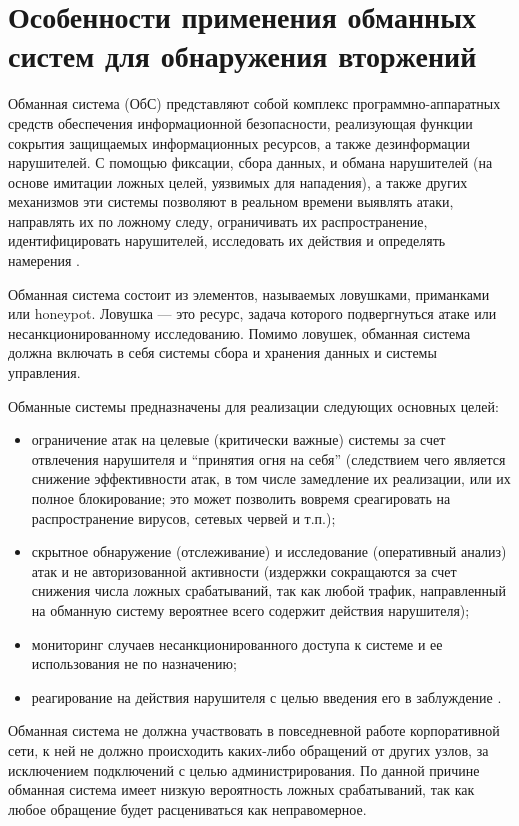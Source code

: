 \section{Особенности применения обманных систем для обнаружения вторжений}

Обманная система (ОбС) представляют собой комплекс программно-аппаратных средств обеспечения информационной безопасности, реализующая функции сокрытия защищаемых информационных ресурсов, а также дезинформации нарушителей. С помощью фиксации, сбора данных, и обмана нарушителей (на основе имитации ложных целей, уязвимых для нападения), а также других механизмов эти системы позволяют в реальном времени выявлять атаки, направлять их по ложному следу, ограничивать их распространение, идентифицировать нарушителей, исследовать их действия и определять намерения \citep{Kotenko2014}.

Обманная система состоит из элементов, называемых ловушками, приманками или honeypot. Ловушка — это ресурс, задача которого подвергнуться атаке или несанкционированному исследованию. Помимо ловушек, обманная система должна включать в себя системы сбора и хранения данных и системы управления. 

Обманные системы предназначены для реализации следующих основных целей:
\begin{itemize}
\item ограничение атак на целевые (критически важные) системы за счет отвлечения нарушителя и “принятия огня на себя” (следствием чего является снижение эффективности атак, в том числе замедление их реализации, или их полное блокирование; это может позволить вовремя среагировать на распространение вирусов, сетевых червей и т.п.);
\item скрытное обнаружение (отслеживание) и исследование (оперативный анализ) атак и не авторизованной активности (издержки сокращаются за счет снижения числа ложных срабатываний, так как любой трафик, направленный на обманную систему вероятнее всего содержит действия нарушителя); 
\item мониторинг случаев несанкционированного доступа к системе и ее использования не по назначению;
\item реагирование на действия нарушителя с целью введения его в заблуждение \citep{Hernacki2004}.
\end{itemize}

Обманная система не должна участвовать в повседневной работе корпоративной сети, к ней не должно происходить каких-либо обращений от других узлов, за исключением подключений с целью администрирования. По данной причине обманная система имеет низкую вероятность ложных срабатываний, так как любое обращение будет расцениваться как неправомерное.

